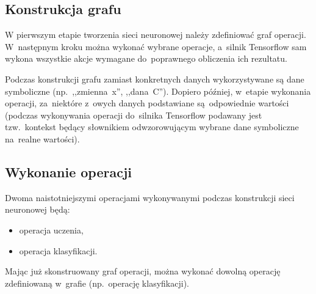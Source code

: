 \subsection{Konstrukcja grafu}
W pierwszym etapie tworzenia sieci neuronowej należy zdefiniować graf operacji. W~następnym kroku można wykonać
wybrane operacje, a~silnik Tensorflow sam wykona wszystkie akcje wymagane do~poprawnego obliczenia ich rezultatu.

Podczas konstrukcji grafu zamiast konkretnych danych wykorzystywane są dane symboliczne (np.~,,zmienna~x'',
,,dana~C''). Dopiero później, w~etapie wykonania operacji, za~niektóre z~owych danych podstawiane
są~odpowiednie wartości (podczas wykonywania operacji do~silnika Tensorflow podawany jest tzw.~kontekst będący
słownikiem odwzorowującym wybrane dane symboliczne na~realne wartości).


\subsection{Wykonanie operacji}
Dwoma naistotniejszymi operacjami wykonywanymi podczas konstrukcji sieci neuronowej będą:
\begin{itemize}
    \item operacja uczenia,
    \item operacja klasyfikacji.
\end{itemize}

Mając już skonstruowany graf operacji, można wykonać dowolną operację zdefiniowaną w~grafie (np.~operację klasyfikacji).

